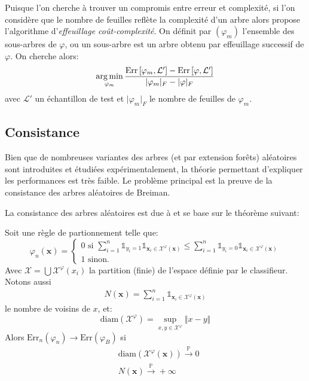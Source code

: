 Puisque l'on cherche à trouver un compromis entre erreur et complexité, si l'on considère que le nombre de feuilles reflète la complexité d'un arbre alors \citet{Breiman1984a} propose l'algorithme d'\emph{effeuillage coût-complexité}.
On définit par $\left( \varphi_m \right)$ l'ensemble des sous-arbres de $\varphi$, ou un sous-arbre est un arbre obtenu par effeuillage successif de $\varphi$. On cherche alors:
\begin{equation*}
    \operatorname*{arg\,min}_{\varphi_m} \frac{\mathrm{Err} \left[ \varphi_m , \mathcal{L}' \right] - \mathrm{Err} \left[ \varphi , \mathcal{L}' \right] }{\vert \varphi_m \vert_F - \vert \varphi \vert_F}
\end{equation*}
avec $\mathcal{L}'$ un échantillon de test et $\vert \varphi_m \vert_F$ le nombre de feuilles de $\varphi_m$.

\subsection{Consistance}

Bien que de nombreuses variantes des arbres (et par extension forêts) aléatoires sont introduites et étudiées expérimentalement, la théorie permettant d'expliquer les performances est très faible.
Le problème principal est la preuve de la consistance des arbres aléatoires de Breiman.

La consistance des arbres aléatoires est due à \citet{Biau2008,Devroye1997} et se base sur le théorème suivant:

\begin{theoreme}
    Soit une règle de partionnement telle que:
    \begin{equation*}
        \varphi_n (\mathbf{x}) = \begin{cases}
            0 \text{ si } \sum_{i=1}^n \mathds{1}_{y_i = 1} \mathds{1}_{\mathbf{x}_i \in \mathcal{X}^\varphi (\mathbf{x})} \leq \sum_{i=1}^n \mathds{1}_{y_i = 0} \mathds{1}_{\mathbf{x}_i \in \mathcal{X}^\varphi (\mathbf{x})} \\
            1 \text{ sinon.}
        \end{cases}
    \end{equation*}
    Avec $\mathcal{X} = \bigcup \mathcal{X}^\varphi (x_i)$ la partition (finie) de l'espace définie par le classifieur.
    Notons aussi
    \begin{align*}
        N(\mathbf{x}) = \sum_{i=1}^n \mathds{1}_{\mathbf{x}_i \in \mathcal{X}^\varphi (\mathbf{x})}
    \end{align*}
    le nombre de voisins de $x$, et:
    \begin{equation*}
        \mathrm{diam} ( \mathcal{X}^\varphi ) = \sup_{x,y \in \mathcal{X}^\varphi} \Vert x - y \Vert
    \end{equation*}
    Alors $\mathrm{Err}_n ( \varphi_n ) \to  \mathrm{Err} ( \varphi_B ) $ si 
    \begin{align*}
        &\mathrm{diam} ( \mathcal{X}^\varphi (\mathbf{x}) ) \xrightarrow{\mathbb{P}} 0 \\
        &N ( \mathbf{x} ) \xrightarrow{\mathbb{P}} +\infty
    \end{align*}
\end{theoreme}

